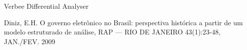 \documentclass[
12pt,		%
openright,	%
twoside,  %
a4paper,			%
chapter=TITLE,		%
english,			%
french,				%
spanish,			%
brazil				%
]{USPSC-classe/USPSC}
\begin{document}
\begin{flushleft}
\begin{flushleft}
\begin{flushleft}
\begin{flushleft}
\begin{flushleft}
\begin{flushleft}
\begin{flushleft}
\begin{flushleft}
[BRITANNICA, 2022] Verbee Differential Analyser
\end{flushleft}


\end{flushleft}


\end{flushleft}


\end{flushleft}


\end{flushleft}


\end{flushleft}


\end{flushleft}


\end{flushleft}


\begin{flushleft}
\begin{flushleft}
\begin{flushleft}
\begin{flushleft}
\begin{flushleft}
\begin{flushleft}
\begin{flushleft}
\begin{flushleft}
[DINIZ, 2009] Diniz, E.H. O governo eletr\^onico no Brasil: perspectiva hist\'orica a partir de um modelo estruturado de an\'alise, RAP — RIO DE JANEIRO 43(1):23-48, JAN./FEV. 2009
\end{flushleft}


\end{flushleft}


\end{flushleft}


\end{flushleft}


\end{flushleft}


\end{flushleft}


\end{flushleft}


\end{flushleft}
\end{document}
